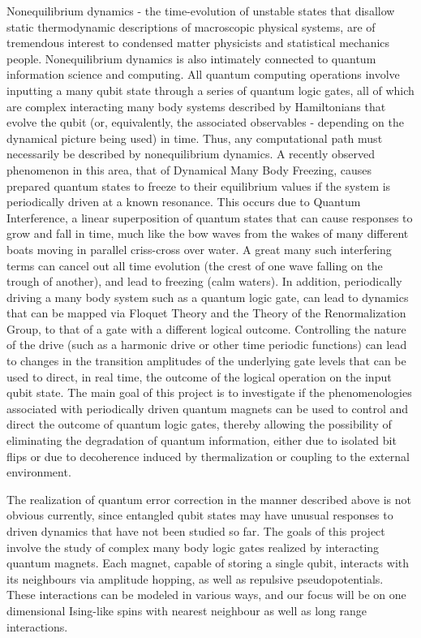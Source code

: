 \documentclass[a4paper,9pt]{article}
\begin{document}
Nonequilibrium dynamics - the time-evolution of unstable states that disallow static thermodynamic descriptions of macroscopic physical systems, are of tremendous interest to condensed matter physicists and statistical mechanics people. Nonequilibrium dynamics is also intimately connected to quantum information science and computing. All quantum computing operations involve inputting a many qubit state through a series of quantum logic gates, all of which are complex interacting many body systems described by Hamiltonians that evolve the qubit (or, equivalently,  the associated observables - depending on the dynamical picture being used) in time. Thus, any computational path must necessarily be described by nonequilibrium dynamics. A recently observed phenomenon in this area, that of Dynamical Many Body Freezing, causes prepared quantum states to freeze to their equilibrium values if the system is periodically driven at a known resonance. This occurs due to Quantum Interference, a linear superposition of quantum states that can cause responses to grow and fall in time, much like the bow waves from the wakes of many different boats moving in parallel criss-cross over water. A great many such interfering terms can cancel out all time evolution (the crest of one wave falling on the trough of another), and lead to freezing (calm waters). In addition, periodically driving a many body system such as a quantum logic gate, can lead to dynamics that can be mapped via Floquet Theory and the Theory of the Renormalization Group, to that of a gate with a different logical outcome. Controlling the nature of the drive (such as a harmonic drive or other time periodic functions) can lead to changes in the transition amplitudes of the underlying gate levels that can be used to direct, in real time, the outcome of the logical operation on the input qubit state. The main goal of this project is to investigate if the phenomenologies associated with periodically driven quantum magnets can be used to control and direct the outcome of quantum logic gates, thereby allowing the possibility of eliminating the degradation of quantum information, either due to isolated bit flips or due to decoherence induced by thermalization or coupling to the external environment. 

The realization of quantum error correction in the manner described above is not obvious currently, since entangled qubit states may have unusual responses to driven dynamics that have not been studied so far. The  goals of this project involve the study of complex many body logic gates realized by interacting quantum magnets. Each magnet, capable of storing a single qubit, interacts with its neighbours via amplitude hopping, as well as repulsive pseudopotentials. These interactions can be modeled in various ways, and our focus will be on one dimensional Ising-like spins with nearest neighbour as well as long range interactions. 
\end{document}
